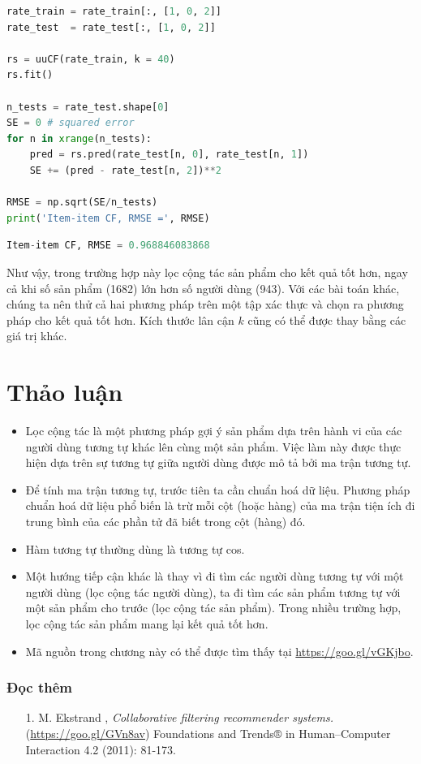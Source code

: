 \begin{lstlisting}[language=Python]
rate_train = rate_train[:, [1, 0, 2]]
rate_test  = rate_test[:, [1, 0, 2]]

rs = uuCF(rate_train, k = 40)
rs.fit()

n_tests = rate_test.shape[0]
SE = 0 # squared error
for n in xrange(n_tests):
    pred = rs.pred(rate_test[n, 0], rate_test[n, 1])
    SE += (pred - rate_test[n, 2])**2

RMSE = np.sqrt(SE/n_tests)
print('Item-item CF, RMSE =', RMSE)
\end{lstlisting}
\kq
\begin{lstlisting}[language=Python]
Item-item CF, RMSE = 0.968846083868
\end{lstlisting}
Như vậy, trong trường hợp này lọc cộng tác sản phẩm cho kết quả tốt
hơn, ngay cả khi số sản phẩm (1682) lớn hơn số người dùng (943).
Với các bài toán khác, chúng ta nên thử cả hai phương pháp trên một tập xác thực và chọn
ra phương pháp cho kết quả tốt hơn. Kích thước lân cận $k$ cũng có thể được thay bằng các giá trị khác.


\section{Thảo luận}
\label{sec:24_discuss}
\begin{itemize}
\item Lọc cộng tác là một phương pháp gợi ý sản phẩm dựa trên hành vi của các người dùng tương tự khác lên cùng một
sản phẩm. Việc làm này được thực hiện dựa trên sự tương tự giữa người dùng được mô tả bởi ma trận tương tự.

\item Để tính ma trận tương tự, trước tiên ta cần chuẩn hoá dữ
liệu. Phương pháp chuẩn hoá dữ liệu phổ biến là trừ mỗi cột (hoặc hàng) của ma trận tiện ích đi trung bình của các phần tử đã biết trong cột (hàng) đó.

\item Hàm tương tự thường dùng là tương tự cos.

\item Một hướng tiếp cận khác là thay vì đi tìm các người dùng tương tự với một người dùng (lọc cộng tác người dùng), ta đi tìm các sản phẩm tương tự
với một sản phẩm cho trước (lọc cộng tác sản phẩm). Trong nhiều trường hợp, lọc cộng tác sản phẩm mang lại kết quả tốt hơn.


\item Mã nguồn trong chương này có thể được tìm thấy tại \url{https://goo.gl/vGKjbo}.
\end{itemize}


\subsubsection{Đọc thêm}
\begin{enumerate}
\item[1.] M. Ekstrand \etal, \textit{Collaborative filtering recommender systems.}
(\url{https://goo.gl/GVn8av}) Foundations and Trends® in Human–Computer Interaction 4.2 (2011): 81-173.
\end{enumerate}

